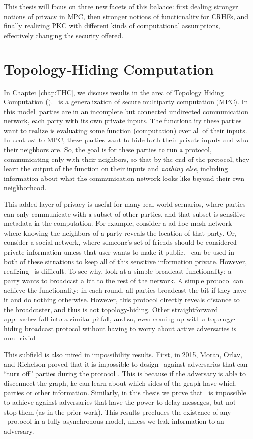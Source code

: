 This thesis will focus on three new facets of this balance: first dealing stronger notions of privacy in MPC, then stronger notions of functionality for CRHFs, and finally realizing PKC with different kinds of computational assumptions, effectively changing the security offered.

\section{Topology-Hiding Computation}
In Chapter \ref{chap:THC}, we discuss results in the area of Topology Hiding Computation (\THC). \THC~is a generalization of secure multiparty computation (MPC). In this model, parties are in an incomplete but connected undirected communication network, each party with its own private inputs. The functionality these parties want to realize is evaluating some function (computation) over all of their inputs. In contrast to MPC, these parties want to hide both their private inputs and who their neighbors are.
So, the goal is for these parties to run a protocol, communicating only with their neighbors, so that by the end of the protocol, they learn the output of the function on their inputs and \emph{nothing else}, including information about what the communication network looks like beyond their own neighborhood.

This added layer of privacy is useful for many real-world scenarios, where parties can only communicate with a subset of other parties, and that subset is sensitive metadata in the computation. For example, consider a ad-hoc mesh network where knowing the neighbors of a party reveals the location of that party. Or, consider a social network, where someone's set of friends should be considered private information unless that user wants to make it public. \THC~can be used in both of these situations to keep all of this sensitive information private. However, realizing \THC~is difficult. To see why, look at a simple broadcast functionality: a party wants to broadcast a bit to the rest of the network. A simple protocol can achieve the functionality: in each round, all parties broadcast the bit if they have it and do nothing otherwise. However, this protocol directly reveals distance to the broadcaster, and thus is not topology-hiding. Other straightforward approaches fall into a similar pitfall, and so, even coming up with a topology-hiding broadcast protocol without having to worry about active adversaries is non-trivial.

This subfield is also mired in impossibility results.
First, in 2015, Moran, Orlav, and Richelson proved that it is impossible to design \THC~against adversaries that can ``turn off'' parties during the protocol \cite{MOR15}. This is because if the adversary is able to disconnect the graph, he can learn about which sides of the graph have which parties or other information. Similarly, in this thesis we prove that \THC~is impossible to achieve against adversaries that have the power to delay messages, but not stop them (as in the prior work). This results precludes the existence of any \THC~protocol in a fully asynchronous model, unless we leak information to an adversary.


